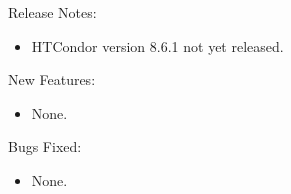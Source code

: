\noindent Release Notes:

\begin{itemize}

\item HTCondor version 8.6.1 not yet released.

\end{itemize}


\noindent New Features:

\begin{itemize}

\item None.

\end{itemize}

\noindent Bugs Fixed:

\begin{itemize}

\item None.

\end{itemize}

